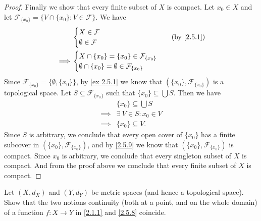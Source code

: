 \begin{proof}
  Finally we show that every finite subset of \(X\) is compact.
  Let \(x_0 \in X\) and let \(\mathcal{F}_{\{x_0\}} = \big\{V \cap \{x_0\} : V \in \mathcal{F}\big\}\).
  We have
  \begin{align*}
             & \begin{cases}
                 X \in \mathcal{F} \\
                 \emptyset \in \mathcal{F}
               \end{cases}                                    & \text{(by \cref{2.5.1})} \\
    \implies & \begin{cases}
                 X \cap \{x_0\} = \{x_0\} \in \mathcal{F}_{\{x_0\}} \\
                 \emptyset \cap \{x_0\} = \emptyset \in \mathcal{F}_{\{x_0\}}
               \end{cases}
  \end{align*}
  Since \(\mathcal{F}_{\{x_0\}} = \big\{\emptyset, \{x_0\}\big\}\), by \cref{ex 2.5.1} we know that \((\{x_0\}, \mathcal{F}_{\{x_0\}})\) is a topological space.
  Let \(S \subseteq \mathcal{F}_{\{x_0\}}\) such that \(\{x_0\} \subseteq \bigcup S\).
  Then we have
  \begin{align*}
             & \{x_0\} \subseteq \bigcup S  \\
    \implies & \exists\ V \in S : x_0 \in V \\
    \implies & \{x_0\} \subseteq V.
  \end{align*}
  Since \(S\) is arbitrary, we conclude that every open cover of \(\{x_0\}\) has a finite subcover in \((\{x_0\}, \mathcal{F}_{\{x_0\}})\), and by \cref{2.5.9} we know that \((\{x_0\}, \mathcal{F}_{\{x_0\}})\) is compact.
  Since \(x_0\) is arbitrary, we conclude that every singleton subset of \(X\) is compact.
  And from the proof above we conclude that every finite subset of \(X\) is compact.
\end{proof}

\begin{exercise}\label{ex 2.5.15}
  Let \((X, d_X)\) and \((Y, d_Y)\) be metric spaces (and hence a topological space).
  Show that the two notions continuity (both at a point, and on the whole domain) of a function \(f : X \to Y\) in \cref{2.1.1} and \cref{2.5.8} coincide.
\end{exercise}

